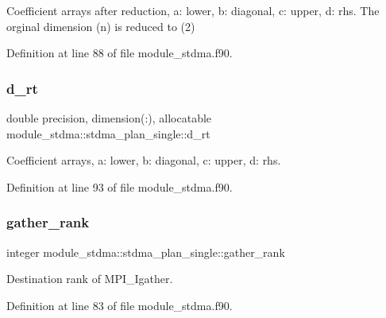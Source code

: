 Coefficient arrays after reduction, a\+: lower, b\+: diagonal, c\+: upper, d\+: rhs. The orginal dimension (n) is reduced to (2) 



Definition at line 88 of file module\+\_\+stdma.\+f90.

\mbox{\label{structmodule__stdma_1_1stdma__plan__single_ac331eacd911644f8bb2e257cb09baa9d}} 
\subsubsection{\texorpdfstring{d\_rt}{d\_rt}}
{\footnotesize\ttfamily double precision, dimension(\+:), allocatable module\+\_\+stdma\+::stdma\+\_\+plan\+\_\+single\+::d\+\_\+rt}



Coefficient arrays, a\+: lower, b\+: diagonal, c\+: upper, d\+: rhs. 



Definition at line 93 of file module\+\_\+stdma.\+f90.

\mbox{\label{structmodule__stdma_1_1stdma__plan__single_a48e694173387e66badd89b9061391c8d}} 
\subsubsection{\texorpdfstring{gather\_rank}{gather\_rank}}
{\footnotesize\ttfamily integer module\+\_\+stdma\+::stdma\+\_\+plan\+\_\+single\+::gather\+\_\+rank}



Destination rank of M\+P\+I\+\_\+\+Igather. 



Definition at line 83 of file module\+\_\+stdma.\+f90.

\mbox{\label{structmodule__stdma_1_1stdma__plan__single_a072d5f52b3188068307a58d1095097dc}} 
